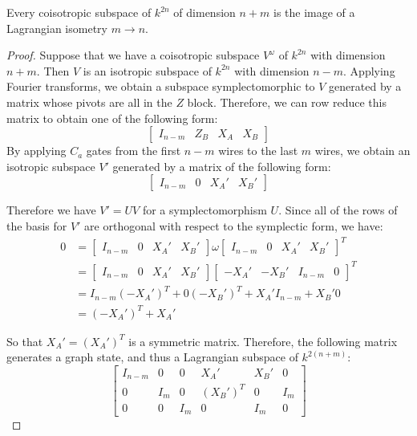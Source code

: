 \begin{theorem}
\label{thm:symstine}

Every coisotropic subspace of $k^{2n}$ of dimension $n+m$ is the image of a Lagrangian isometry $m\to n$.
\end{theorem}
\begin{proof}
Suppose that we have a coisotropic subspace $V^\omega$ of $k^{2n}$ with dimension $n+m$. 
Then $V$ is an isotropic subspace of $k^{2n}$ with dimension $n-m$.
Applying Fourier transforms, we obtain a  subspace symplectomorphic to $V$ generated by a matrix whose pivots are all in the $Z$ block.  Therefore, we can row reduce this matrix to obtain one of the following form:
$$
\left[\begin{array}{cc|cc}
I_{n-m} & Z_B & X_A & X_B 
\end{array}\right]
$$
By applying $C_a$ gates from the first $n-m$ wires to the last $m$ wires, we obtain an isotropic subspace $V'$ generated by a matrix of the following form:
$$
\left[\begin{array}{cc|cc}
I_{n-m} & 0 & X_A' & X_B' 
\end{array}\right]
$$

Therefore we have $V' = U V$ for a symplectomorphism $U$.
Since all of the rows of the basis for $V'$  are orthogonal with respect to the symplectic form, we have:
\begin{align*}
0 &=
\left[\begin{array}{cc|cc}
I_{n-m} & 0 & X_A' & X_B' 
\end{array}\right]
\omega
\left[\begin{array}{cc|cc}
I_{n-m} & 0 & X_A' & X_B' 
\end{array}\right]^T\\
&=
\left[\begin{array}{cc|cc}
I_{n-m} & 0 & X_A' & X_B' 
\end{array}\right]
\left[\begin{array}{cc|cc}
 -X_A' & -X_B'  & I_{n-m} & 0
\end{array}\right]^T\\
&=
I_{n-m}(-X_A')^T +  0( -X_B' )^T +X_A'I_{n-m} + X_B' 0 \\
&=
(-X_A')^T +X_A'
\end{align*}




So that  $X_A'=(X_A')^T$ is a symmetric matrix. 
Therefore, the following matrix generates a graph state, and thus a Lagrangian subspace of $k^{2(n+m)}$:
$$
\left[\begin{array}{ccc|ccc}
I_{n-m} & 0    & 0 & X_A'       & X_B' & 0\\
0           & I_m & 0 & (X_B')^T & 0     &  I_m \\
0           & 0    & I_m  & 0            & I_m & 0
\end{array}\right]
$$


\end{proof}
